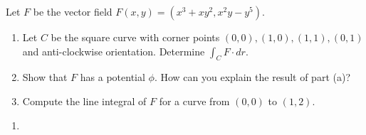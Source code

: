 \begin{exercise}
	Let $F$ be the vector field $F(x,y) = (x^3 + xy^2, x^2 y - y^5)$.
	\begin{enumerate}
		\item Let $C$ be the square curve with corner points $(0,0), (1,0), (1,1), (0,1)$ and anti-clockwise orientation. Determine $\int_C F \cdot dr$.

		\item Show that $F$ has a potential $\phi$. How can you explain the result of part (a)?

		\item Compute the line integral of $F$ for a curve from $(0,0)$ to $(1,2)$.
	\end{enumerate}
\end{exercise}

\begin{solution}
	\begin{enumerate}
		\item

\end{enumerate}
\end{solution}
